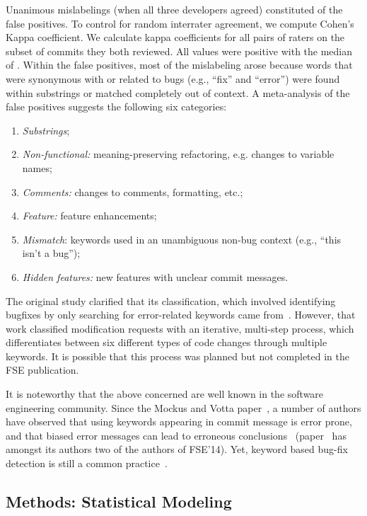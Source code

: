 \documentclass[acmsmall]{acmart}
\begin{document}
Unanimous mislabelings (when all three developers agreed) constituted \commitsUnanimousFalsePositives
of the false positives. To control for random interrater agreement, we
compute Cohen's Kappa coefficient. We calculate kappa
coefficients for all pairs of raters on the subset of commits they both
reviewed. All values were positive with the median of \commitsKappaMedian. Within the false
positives, most of the mislabeling arose because words that were synonymous
with or related to bugs (e.g., ``fix'' and ``error'') were found within
substrings or matched completely out of context. A meta-analysis of the
false positives suggests the following six categories:
\begin{enumerate}
\item {\it Substrings};
\item {\it Non-functional:} meaning-preserving refactoring, e.g. changes to
  variable names;
\item {\it Comments:} changes to comments, formatting, etc.;
\item {\it Feature:} feature enhancements;
\item {\it Mismatch}: keywords used in an unambiguous non-bug context
  (e.g., ``this isn't a bug'');
\item {\it Hidden features:} new features with unclear commit messages.
\end{enumerate}
The original study clarified that its classification, which involved
identifying bugfixes by only searching for error-related keywords came
from~\cite{Mockus00}.  However, that work classified modification requests
with an iterative, multi-step process, which differentiates between six
different types of code changes through multiple keywords. It is possible
that this process was planned but not completed in the FSE publication.

It is noteworthy that the above concerned are well known in the
software engineering community. Since the Mockus and Votta
paper~\cite{Mockus00}, a number of authors have observed that using keywords
appearing in commit message is error prone, and that biased error messages
can lead to erroneous conclusions~\cite{Bird,Herzig,Tian} (paper~\cite{Bird}
has amongst its authors two of the authors of FSE'14).  Yet, keyword based
bug-fix detection is still a common practice~\cite{Casalnuovo,Dyer}.  




\subsection{Methods: Statistical Modeling}
\end{document}
